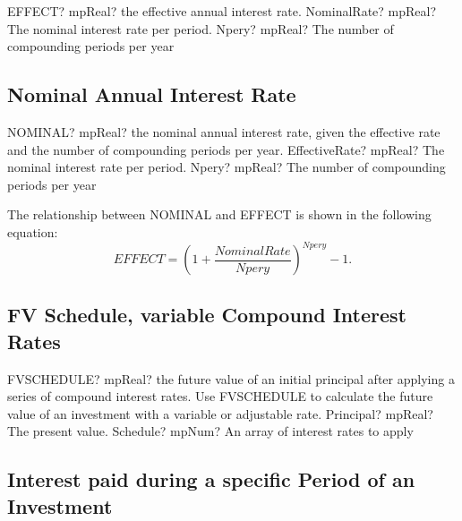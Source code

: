 \begin{mpFunctionsExtract}
	\mpWorksheetFunctionTwoNotImplemented
	{EFFECT? mpReal? the effective annual interest rate.}
	{NominalRate? mpReal? The nominal interest rate per period.}
	{Npery? mpReal? The number of compounding periods per year}
\end{mpFunctionsExtract}




\subsection{Nominal Annual Interest Rate}

\begin{mpFunctionsExtract}
	\mpWorksheetFunctionTwoNotImplemented
	{NOMINAL? mpReal? the nominal annual interest rate, given the effective rate and the number of compounding periods per year.}
	{EffectiveRate? mpReal? The nominal interest rate per period.}
	{Npery? mpReal? The number of compounding periods per year}
\end{mpFunctionsExtract}


\vspace{0.3cm}
The relationship between NOMINAL and EFFECT is shown in the following equation: 
\begin{equation}
EFFECT = \left(1+ \frac{NominalRate}{Npery}\right)^{Npery}-1.
\end{equation}





\subsection{FV Schedule, variable Compound Interest Rates}

\begin{mpFunctionsExtract}
	\mpWorksheetFunctionTwoNotImplemented
	{FVSCHEDULE? mpReal? the future value of an initial principal after applying a series of compound interest rates. Use FVSCHEDULE to calculate the future value of an investment with a variable or adjustable rate.}
	{Principal? mpReal? The present value.}
	{Schedule? mpNum? An array of interest rates to apply}
\end{mpFunctionsExtract}




\subsection{Interest paid during a specific Period of an Investment}

